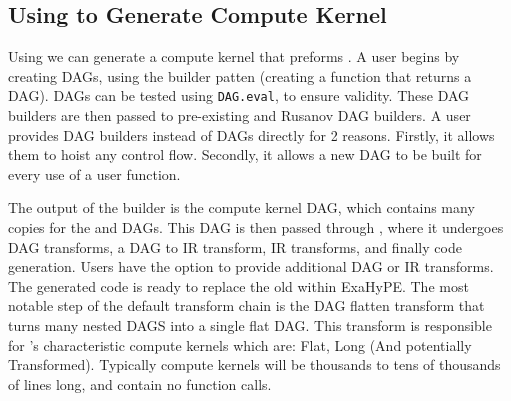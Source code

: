 \subsection{Using \phlat to Generate Compute Kernel}
Using \phlat we can generate a compute kernel that preforms .
A user begins by creating  DAGs, using the builder patten (creating a function that returns a DAG).
DAGs can be tested using \texttt{DAG.eval}, to ensure validity.
These DAG builders are then passed to pre-existing  and Rusanov DAG builders.
A user provides DAG builders instead of DAGs directly for 2 reasons.
Firstly, it allows them to hoist any control flow.
Secondly, it allows a new DAG to be built for every use of a user function.

The output of the  builder is the compute kernel DAG, which contains many copies for the  and  DAGs.
This DAG is then passed through \phlat, where it undergoes DAG transforms, a DAG to IR transform, IR transforms, and finally code generation.
Users have the option to provide additional DAG or IR transforms.
The generated code is ready to replace the old  within ExaHyPE.
The most notable step of the default transform chain is the DAG flatten transform that turns many nested DAGS into a single flat DAG.
This transform is responsible for \phlat's characteristic compute kernels which are: Flat, Long (And potentially Transformed).
Typically compute kernels will be thousands to tens of thousands of lines long, and contain no function calls.   